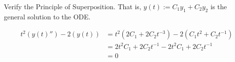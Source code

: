 Verify the Principle of Superposition. That is, $y(t) := C_1y_1 + C_2y_2$ is the general solution to the ODE.

\begin{align*}
    t^2(y(t)'') - 2(y(t)) &= t^2(2 C_1 + 2 C_2 t^{-3}) - 2(C_1 t^2 + C_2 t^{-1})\\
    &= 2t^2 C_1 + 2C_2t^{-1} - 2 t^2 C_1 + 2 C_2 t^{-1}\\
    &= 0
\end{align*}